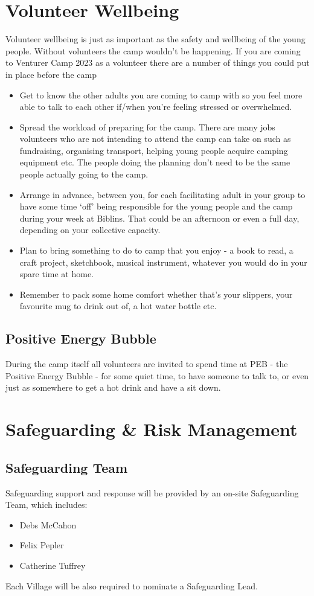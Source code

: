 \documentclass[a4paper, 11pt]{report}
\begin{document}
\chapter{Volunteer Wellbeing}
Volunteer wellbeing is just as important as the safety and wellbeing of the young people. Without volunteers the camp wouldn't be happening.
If you are coming to Venturer Camp 2023 as a volunteer there are a number of things you could put in place before the camp
\begin{itemize}
    \item Get to know the other adults you are coming to camp with so you feel more able to talk to each other if/when you're feeling stressed or overwhelmed.
    \item Spread the workload of preparing for the camp. There are many jobs volunteers who are not intending to attend the camp can take on such as fundraising, organising transport, helping young people acquire camping equipment etc. The people doing the planning don't need to be the same people actually going to the camp.
    \item Arrange in advance, between you, for each facilitating adult in your group to have some time `off' being responsible for the young people and the camp during your week at Biblins. That could be an afternoon or even a full day, depending on your collective capacity.
    \item Plan to bring something to do to camp that you enjoy - a book to read, a craft project, sketchbook, musical instrument, whatever you would do in your spare time at home.
    \item Remember to pack some home comfort whether that's your slippers, your favourite mug to drink out of, a hot water bottle etc.
\end{itemize}
\section{Positive Energy Bubble}
During the camp itself all volunteers are invited to spend time at PEB - the Positive Energy Bubble - for some quiet time, to have someone to talk to, or even just as somewhere to get a hot drink and have a sit down.


\chapter{Safeguarding \& Risk Management}
\section{Safeguarding Team}
Safeguarding support and response will be provided by an on-site Safeguarding Team, which includes:
\begin{itemize}
    \item Debs McCahon
    \item Felix Pepler
    \item Catherine Tuffrey
\end{itemize}
Each Village will be also required to nominate a Safeguarding Lead.
\end{document}
